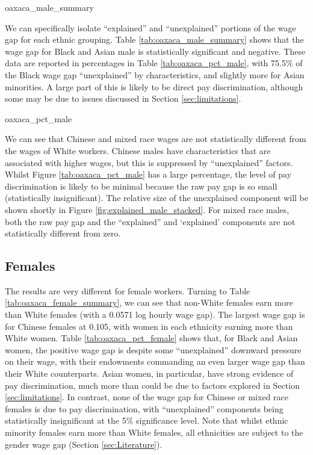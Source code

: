 \documentclass[class=article, crop=false]{standalone}
\begin{document}
{oaxaca_male_summary}

We can specifically isolate \enquote{explained} and \enquote{unexplained} portions of the wage gap for each ethnic grouping. Table \ref{tab:oaxaca_male_summary} shows that the wage gap for Black and Asian male is statistically significant and negative. These data are reported in percentages in Table \ref{tab:oaxaca_pct_male}, with 75.5\% of the Black wage gap \enquote{unexplained} by characteristics, and slightly more for Asian minorities. A large part of this is likely to be direct pay discrimination, although some may be due to issues discussed in Section \ref{sec:limitations}.

{oaxaca_pct_male}

We can see that Chinese and mixed race wages are not statistically different from the wages of White workers. Chinese males have characteristics that are associated with higher wages, but this is suppressed by \enquote{unexplained} factors. Whilst Figure \ref{tab:oaxaca_pct_male} has a large percentage, the level of pay discrimination is likely to be minimal because the raw pay gap is so small (statistically insignificant). The relative size of the unexplained component will be shown shortly in Figure \ref{fig:explained_male_stacked}. For mixed race males, both the raw pay gap and the \enquote{explained} and \enquote*{explained} components are not statistically different from zero.

\subsection{Females}
\label{sec:Females}
The results are very different for female workers. Turning to Table \ref{tab:oaxaca_female_summary}, we can see that non-White females earn more than White females (with a 0.0571 log hourly wage gap). The largest wage gap is for Chinese females at 0.105, with women in each ethnicity earning more than White women. Table \ref{tab:oaxaca_pct_female} shows that, for Black and Asian women, the positive wage gap is despite some \enquote{unexplained} downward pressure on their wage, with their endowments commanding an even larger wage gap than their White counterparts. Asian women, in particular, have strong evidence of pay discrimination, much more than could be due to factors explored in Section \ref{sec:limitations}. In contrast, none of the wage gap for Chinese or mixed race females is due to pay discrimination, with \enquote{unexplained} components being statistically insignificant at the 5\% significance level. Note that whilst ethnic minority females earn more than White females, all ethnicities are subject to the gender wage gap (Section \ref{sec:Literature}).
\end{document}
